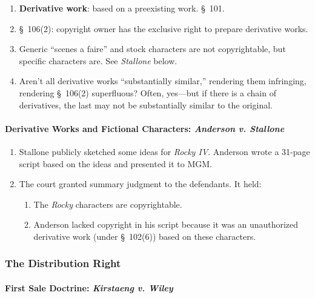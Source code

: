 \begin{enumerate}
    \item \textbf{Derivative work}: based on a preexisting work. \S\ 101.
    \item \S\ 106(2): copyright owner has the exclusive right to prepare 
    derivative works.
    \item Generic ``scenes a faire'' and stock characters are not 
    copyrightable, but specific characters are. See \emph{Stallone} below.
    \item Aren't all derivative works ``substantially similar,'' rendering 
    them infringing, rendering \S\ 106(2) superfluous? Often, yes---but if 
    there is a chain of derivatives, the last may not be substantially similar 
    to the original.
\end{enumerate}

\paragraph{Derivative Works and Fictional Characters: \emph{Anderson v. 
Stallone}}

\begin{enumerate}
    \item Stallone publicly sketched some ideas for \emph{Rocky IV}. Anderson 
    wrote a 31-page script based on the ideas and presented it to MGM.
    \item The court granted summary judgment to the defendants. It held:
    \begin{enumerate}
        \item The \emph{Rocky} characters are copyrightable.
        \item Anderson lacked copyright in his script because it was an 
        unauthorized derivative work (under \S\ 102(6)) based on these 
        characters.
    \end{enumerate}
\end{enumerate}

\subsubsection{The Distribution Right}

\paragraph{First Sale Doctrine: \emph{Kirstaeng v. Wiley}}

